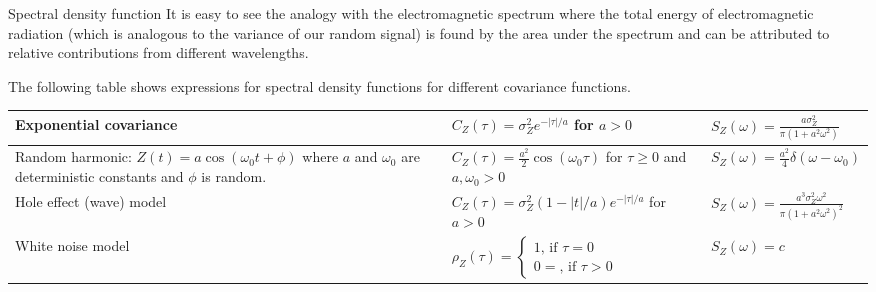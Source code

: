 \documentclass[8pt]{beamer}
\renewcommand{\emph}[1]{\textcolor{myorange}{#1}}
\begin{document}
\begin{frame}{Spectral density function}
    It is easy to see the analogy with the \emph{electromagnetic spectrum} where the \emph{total energy} of \emph{electromagnetic radiation} (which is analogous to the variance of our random signal) is found by the \emph{area under the spectrum} and can be attributed to \emph{relative contributions} from different \emph{wavelengths}.
    
    The following table shows expressions for  \emph{spectral density functions} for different \emph{covariance functions}.
    \begin{center}
        \begin{tabular}{|p{3cm}|p{3.8cm}|p{3cm}|}
      Exponential covariance & $C_Z (\tau) = \sigma_Z^2 e^{-|\tau|/a}$ for  $a>0$ & $S_Z (\omega) = \frac{a \sigma_Z^2}{\pi(1+a^2 \omega^2)}$ \\ \hline
      Random harmonic: $Z(t) = a\cos(\omega_0 t + \phi)$ where  $a$ and $\omega_0$ are deterministic constants and $\phi$ is  random. & $C_Z (\tau) = \frac{a^2}{2} \cos(\omega_0 \tau)$  for $\tau \geq 0$ and $a, \omega_0 >0$ & $S_Z (\omega) = \frac{a^2}{4}\delta(\omega-\omega_0)$ \\ \hline
      Hole effect (wave) model & $C_Z (\tau) = \sigma_Z^2 (1-|t|/a)e^{-|\tau|/a}$ for $a>0$ & $S_Z (\omega) = \frac{a^3 \sigma_Z^2 \omega^2}{\pi(1+a^2 \omega^2)^2}$ \\ \hline
      White noise model &  $ \rho_Z (\tau) = \left\{ \begin{array}{l}  1 \text{, if } \tau=0  \\ 0 = \text{, if } \tau>0 \end{array} \right. $ & $S_Z(\omega) = c$\\ 
  \end{tabular}
    \end{center}
 

\end{frame}
\end{document}

